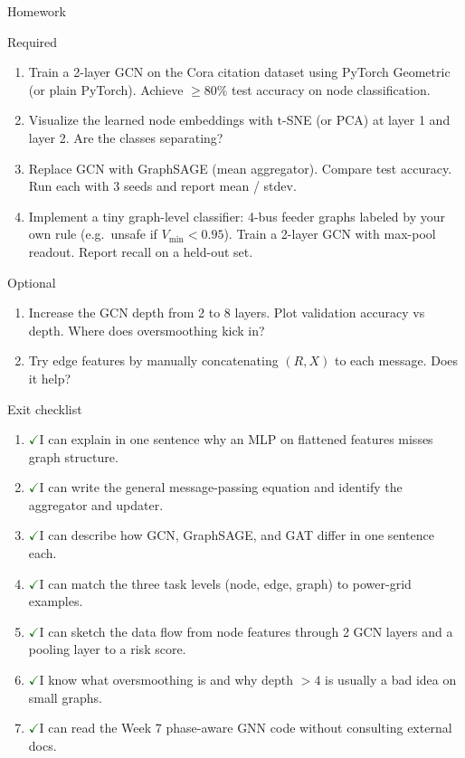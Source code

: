 \documentclass[aspectratio=169,10pt]{beamer}
\newcommand{\checkitem}{\textcolor{darkgreen}{\Large$\checkmark$}\;}
\begin{document}
\begin{frame}{Homework}
\begin{block}{Required}
\begin{enumerate}
  \item Train a 2-layer GCN on the Cora citation dataset using PyTorch Geometric (or plain PyTorch). Achieve $\geq 80\%$ test accuracy on node classification.
  \item Visualize the learned node embeddings with t-SNE (or PCA) at layer 1 and layer 2. Are the classes separating?
  \item Replace GCN with GraphSAGE (mean aggregator). Compare test accuracy. Run each with 3 seeds and report mean / stdev.
  \item Implement a tiny graph-level classifier: 4-bus feeder graphs labeled by your own rule (e.g.\ unsafe if $V_{\min} < 0.95$). Train a 2-layer GCN with max-pool readout. Report recall on a held-out set.
\end{enumerate}
\end{block}
\begin{block}{Optional}
\begin{enumerate}
  \item Increase the GCN depth from 2 to 8 layers. Plot validation accuracy vs depth. Where does oversmoothing kick in?
  \item Try edge features by manually concatenating $(R, X)$ to each message. Does it help?
\end{enumerate}
\end{block}
\end{frame}

\begin{frame}{Exit checklist}
\begin{enumerate}
  \item \checkitem I can explain in one sentence why an MLP on flattened features misses graph structure.
  \item \checkitem I can write the general message-passing equation and identify the aggregator and updater.
  \item \checkitem I can describe how GCN, GraphSAGE, and GAT differ in one sentence each.
  \item \checkitem I can match the three task levels (node, edge, graph) to power-grid examples.
  \item \checkitem I can sketch the data flow from node features through 2 GCN layers and a pooling layer to a risk score.
  \item \checkitem I know what oversmoothing is and why depth $> 4$ is usually a bad idea on small graphs.
  \item \checkitem I can read the Week 7 phase-aware GNN code without consulting external docs.
\end{enumerate}
\end{frame}
\end{document}

